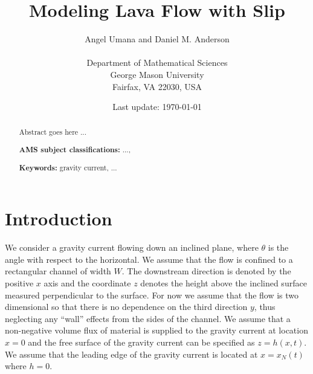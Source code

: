 \documentclass[11pt]{article}
\begin{document}
\baselineskip=24pt


%
\title{Modeling Lava Flow with Slip}
%
\author{Angel Umana and Daniel M. Anderson \\ \\
Department of Mathematical Sciences \\
George Mason University \\
Fairfax, VA 22030, USA}
%
\date{Last update: \today}
%
\maketitle
\begin{abstract}
Abstract goes here ...

\bigskip\noindent
{\bf AMS subject classifications:} ..., 

\bigskip\noindent
{\bf Keywords:} gravity current, ...
\end{abstract}

\section{Introduction}

We consider a gravity current flowing down an inclined plane, where $\theta$ is the angle with respect to the horizontal.  We assume that the flow is confined to a rectangular 
channel of width $W$.  The downstream direction is denoted by the positive $x$ axis and the coordinate $z$ denotes
the height above the inclined surface measured perpendicular to the surface.  For now we assume that the flow is two dimensional so that there is no dependence 
on the third direction $y$, thus neglecting any ``wall'' effects from the sides of the channel.  We assume that a non-negative volume flux of material is supplied to the gravity current at location $x=0$ and the free surface of the gravity current can be specified as $z=h(x,t)$.  We assume that the leading edge of the gravity current is located at $x=x_N(t)$ where $h=0$.
\end{document}
